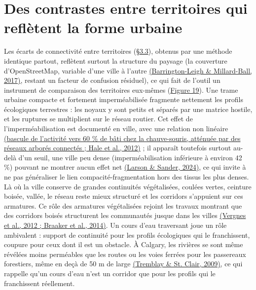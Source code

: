 \documentclass[a4paper,11pt]{report}
\begin{document}
\section{Des contrastes entre territoires qui reflètent la forme urbaine}\label{sec:4.2}

Les écarts de connectivité entre territoires (\hyperref[sec:3.3]{§3.3}), obtenus par une méthode identique partout, reflètent surtout la structure du paysage (la couverture d'OpenStreetMap, variable d'une ville à l'autre \hyperref[sec:bibliographie]{(Barrington-Leigh \& Millard-Ball, 2017)}, restant un facteur de confusion résiduel), ce qui fait de l'outil un instrument de comparaison des territoires eux-mêmes (\hyperref[fig:19]{Figure 19}). Une trame urbaine compacte et fortement imperméabilisée fragmente nettement les profils écologiques terrestres : les noyaux y sont petits et séparés par une matrice hostile, et les ruptures se multiplient sur le réseau routier. Cet effet de l'imperméabilisation est documenté en ville, avec une relation non linéaire \hyperref[sec:bibliographie]{(bascule de l'activité vers 60 \% de bâti chez la chauve-souris, atténuée par des réseaux arborés connectés ; Hale et al., 2012)} ; il apparaît toutefois surtout au-delà d'un seuil, une ville peu dense (imperméabilisation inférieure à environ 42 \%) pouvant ne montrer aucun effet net \hyperref[sec:bibliographie]{(Larson \& Sander, 2024)}, ce qui invite à ne pas généraliser le lien compacité-fragmentation hors des tissus les plus denses. Là où la ville conserve de grandes continuités végétalisées, coulées vertes, ceinture boisée, vallée, le réseau reste mieux structuré et les corridors s'appuient sur ces armatures. Ce rôle des armatures végétalisées rejoint les travaux montrant que des corridors boisés structurent les communautés jusque dans les villes \hyperref[sec:bibliographie]{(Vergnes et al., 2012 ; Braaker et al., 2014)}. Un cours d'eau traversant joue un rôle ambivalent : support de continuité pour les profils écologiques qui le franchissent, coupure pour ceux dont il est un obstacle. À Calgary, les rivières se sont même révélées moins perméables que les routes ou les voies ferrées pour les passereaux forestiers, même en deçà de 50 m de large \hyperref[sec:bibliographie]{(Tremblay \& St. Clair, 2009)}, ce qui rappelle qu'un cours d'eau n'est un corridor que pour les profils qui le franchissent réellement.
\end{document}
